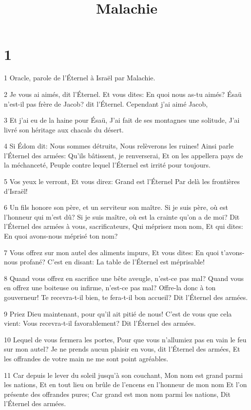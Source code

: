 

\title{Malachie}


\chapter{1}

\par 1 Oracle, parole de l'Éternel à Israël par Malachie.
\par 2 Je vous ai aimés, dit l'Éternel. Et vous dites: En quoi nous as-tu aimés? Ésaü n'est-il pas frère de Jacob? dit l'Éternel. Cependant j'ai aimé Jacob,
\par 3 Et j'ai eu de la haine pour Ésaü, J'ai fait de ses montagnes une solitude, J'ai livré son héritage aux chacals du désert.
\par 4 Si Édom dit: Nous sommes détruits, Nous relèverons les ruines! Ainsi parle l'Éternel des armées: Qu'ils bâtissent, je renverserai, Et on les appellera pays de la méchanceté, Peuple contre lequel l'Éternel est irrité pour toujours.
\par 5 Vos yeux le verront, Et vous direz: Grand est l'Éternel Par delà les frontières d'Israël!
\par 6 Un fils honore son père, et un serviteur son maître. Si je suis père, où est l'honneur qui m'est dû? Si je suis maître, où est la crainte qu'on a de moi? Dit l'Éternel des armées à vous, sacrificateurs, Qui méprisez mon nom, Et qui dites: En quoi avons-nous méprisé ton nom?
\par 7 Vous offrez sur mon autel des aliments impurs, Et vous dites: En quoi t'avons-nous profané? C'est en disant: La table de l'Éternel est méprisable!
\par 8 Quand vous offrez en sacrifice une bête aveugle, n'est-ce pas mal? Quand vous en offrez une boiteuse ou infirme, n'est-ce pas mal? Offre-la donc à ton gouverneur! Te recevra-t-il bien, te fera-t-il bon accueil? Dit l'Éternel des armées.
\par 9 Priez Dieu maintenant, pour qu'il ait pitié de nous! C'est de vous que cela vient: Vous recevra-t-il favorablement? Dit l'Éternel des armées.
\par 10 Lequel de vous fermera les portes, Pour que vous n'allumiez pas en vain le feu sur mon autel? Je ne prends aucun plaisir en vous, dit l'Éternel des armées, Et les offrandes de votre main ne me sont point agréables.
\par 11 Car depuis le lever du soleil jusqu'à son couchant, Mon nom est grand parmi les nations, Et en tout lieu on brûle de l'encens en l'honneur de mon nom Et l'on présente des offrandes pures; Car grand est mon nom parmi les nations, Dit l'Éternel des armées.
